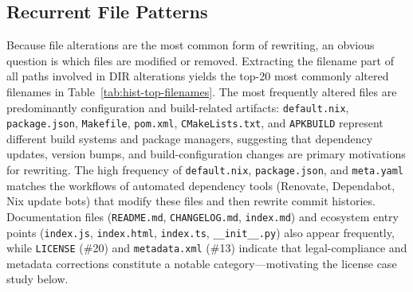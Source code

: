 \subsection{Recurrent File Patterns}
\label{subsec:hist-sec-files}

Because file alterations are the most common form of rewriting, an obvious question is which files are modified or removed.
Extracting the filename part of all paths involved in DIR alterations yields the top-20 most commonly altered filenames in Table~\ref{tab:hist-top-filenames}.
The most frequently altered files are predominantly configuration and build-related artifacts: \texttt{default.nix}, \texttt{package.json}, \texttt{Makefile}, \texttt{pom.xml}, \texttt{CMakeLists.txt}, and \texttt{APKBUILD} represent different build systems and package managers, suggesting that dependency updates, version bumps, and build-configuration changes are primary motivations for rewriting.
The high frequency of \texttt{default.nix}, \texttt{package.json}, and \texttt{meta.yaml} matches the workflows of automated dependency tools (Renovate, Dependabot, Nix update bots) that modify these files and then rewrite commit histories.
Documentation files (\texttt{README.md}, \texttt{CHANGELOG.md}, \texttt{index.md}) and ecosystem entry points (\texttt{index.js}, \texttt{index.html}, \texttt{index.ts}, \texttt{\_\_init\_\_.py}) also appear frequently, while \texttt{LICENSE} (\#20) and \texttt{metadata.xml} (\#13) indicate that legal-compliance and metadata corrections constitute a notable category---motivating the license case study below.

